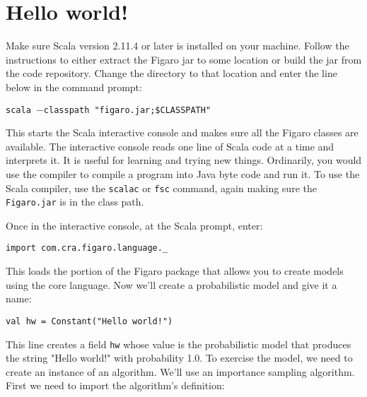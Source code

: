 
\chapter{Hello world!} %

\label{Hello world!} %


Make sure Scala version 2.11.4 or later is installed on your machine. Follow the instructions to either extract the Figaro jar to some location or build the jar from the code repository. Change the directory to that location and enter the line below in the command prompt:

\begin{flushleft}
\texttt{scala $-$classpath "figaro.jar;\$CLASSPATH"}
\end{flushleft}

This starts the Scala interactive console and makes sure all the Figaro classes are available. The interactive console reads one line of Scala code at a time and interprets it. It is useful for learning and trying new things. Ordinarily, you would use the compiler to compile a program into Java byte code and run it. To use the Scala compiler, use the \texttt{scalac} or  \texttt{fsc} command, again making sure the \texttt{Figaro.jar} is in the class path.

Once in the interactive console, at the Scala prompt, enter:

\begin{flushleft}
\texttt{import com.cra.figaro.language.\_}
\end{flushleft}

This loads the portion of the Figaro package that allows you to create models using the core language. Now we'll create a probabilistic model and give it a name:

\begin{flushleft}
\texttt{val hw = Constant("Hello world!")}
\end{flushleft}

This line creates a field \texttt{hw} whose value is the probabilistic model that produces the string "Hello world!" with probability 1.0. To exercise the model, we need to create an instance of an algorithm. We'll use an importance sampling algorithm. First we need to import the algorithm's definition:

